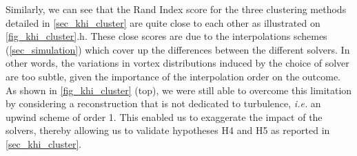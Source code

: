 Similarly, we can see that the Rand Index score for the three clustering
methods detailed in \autoref{sec_khi_cluster} are quite close to each other as
illustrated on \autoref{fig_khi_cluster}.h. These close scores are due to the 
interpolations schemes (\autoref{sec_simulation}) which cover up the differences 
between the different solvers.
In other words, the variations in vortex distributions induced by the choice of solver are too subtle, given the importance of the interpolation order on the outcome. As shown in \autoref{fig_khi_cluster} (top), we were still able to overcome this limitation by considering a
reconstruction that is not dedicated to turbulence, \emph{i.e.} an upwind scheme 
of order 1. This enabled us to exaggerate the impact of the solvers, thereby allowing us to
validate hypotheses H4 and H5 as reported in \autoref{sec_khi_cluster}.
